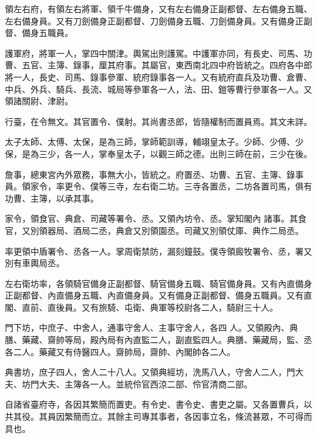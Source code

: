 \begin{pinyinscope}
 領左右府，有領左右將軍、領千牛備身，又有左右備身正副都督、左右備身五職、左右備身員。又有刀劍備身正副都督、刀劍備身五職、刀劍備身員。又有備身正副督、備身五職員。



 護軍府，將軍一人，掌四中關津。輿駕出則護駕。中護軍亦同，有長史、司馬、功曹、五官、主簿、錄事，厘其府事。其屬官，東西南北四中府皆統之。四府各中郎將一人，長史、司馬、錄事參軍、統府錄事各一人。又有統府直兵及功曹、倉曹、中兵、外兵、騎兵、長流、城局等參軍各一人，法、田、鎧等曹行參軍各一人。又領諸關尉、津尉。



 行臺，在令無文。其官置令、僕射。其尚書丞郎，皆隨權制而置員焉。其文未詳。



 太子太師、太傅、太保，是為三師，掌師範訓導，輔翊皇太子。少師、少傅、少保，是為三少，各一人，掌奉皇太子，以觀三師之德。出則三師在前，三少在後。



 詹事，總東宮內外眾務，事無大小，皆統之。府置丞、功曹、五官、主簿、錄事員。領家令，率更令、僕等三寺，左右衛二坊。三寺各置丞，二坊各置司馬，俱有功曹、主簿，以承其事。



 家令，領食官、典倉、司藏等署令、丞。又領內坊令、丞。掌知閣內
 諸事。其食官，又別領器局、酒局二丞，典倉又別領園丞。司藏又別領仗庫、典作二局丞。



 率更領中盾署令、丞各一人。掌周衛禁防，漏刻鐘鼓。僕寺領廄牧署令、丞，署又別有車輿局丞。



 左右衛坊率，各領騎官備身正副都督、騎官備身五職、騎官備身員。又有內直備身正副都督、內直備身五職、內直備身員。又有備身正副都督、備身五職員。又有直閣、直前、直後員。又有旅騎、屯衛、典軍等校尉各二人，騎尉三十人。



 門下坊，中庶子、中舍人，通事守舍人、主事守舍人，各四
 人。又領殿內、典膳、藥藏、齋帥等局，殿內局有內直監二人，副直監四人。典膳、藥藏局，監、丞各二人。藥藏又有侍醫四人。齋帥局，齋帥、內閣帥各二人。



 典書坊，庶子四人，舍人二十八人。又領典經坊，洗馬八人，守舍人二人，門大夫、坊門大夫、主簿各一人。並統伶官西涼二部、伶官清商二部。



 自諸省臺府寺，各因其繁簡而置吏。有令史、書令史、書吏之屬。又各置曹兵，以共其役。其員因繁簡而立。其餘主司專其事者，各因事立名，條流甚眾，不可得而具也。




\end{pinyinscope}
